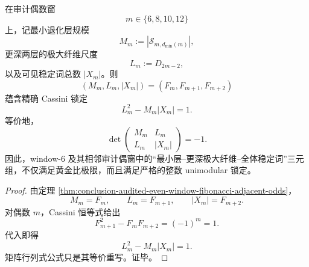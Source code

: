 \begin{corollary}\label{cor:conclusion-audited-even-window-cassini-lock}
在审计偶数窗
\[
m\in\{6,8,10,12\}
\]
上，记最小退化层规模
\[
M_m:=|\mathcal S_{m,d_{\min}(m)}|,
\]
更深两层的极大纤维尺度
\[
L_m:=D_{2m-2},
\]
以及可见稳定词总数 \(|X_m|\)。则
\[
(M_m,L_m,|X_m|)=(F_m,F_{m+1},F_{m+2})
\]
蕴含精确 Cassini 锁定
\[
L_m^2-M_m|X_m|=1.
\]
等价地，
\[
\det
\begin{pmatrix}
M_m & L_m\\
L_m & |X_m|
\end{pmatrix}
=-1.
\]
因此，window-\(6\) 及其相邻审计偶窗中的“最小层--更深极大纤维--全体稳定词”三元组，不仅满足黄金比极限，而且满足严格的整数 unimodular 锁定。
\end{corollary}
\begin{proof}
由定理 \ref{thm:conclusion-audited-even-window-fibonacci-adjacent-odds}，
\[
M_m=F_m,\qquad L_m=F_{m+1},\qquad |X_m|=F_{m+2}.
\]
对偶数 \(m\)，Cassini 恒等式给出
\[
F_{m+1}^2-F_mF_{m+2}=(-1)^m=1.
\]
代入即得
\[
L_m^2-M_m|X_m|=1.
\]
矩阵行列式公式只是其等价重写。证毕。
\end{proof}

\endinput
